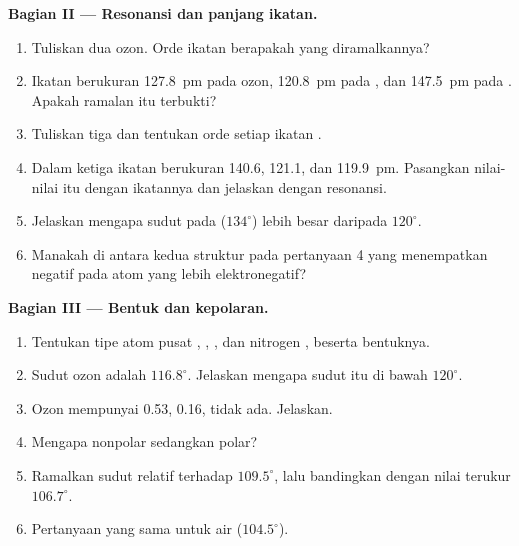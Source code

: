 \begin{problem}
\medskip
\noindent\textbf{Bagian II --- Resonansi dan panjang ikatan.}
\begin{enumerate}[resume]
  \item Tuliskan dua  ozon. Orde ikatan berapakah yang
        diramalkannya?
  \item Ikatan  berukuran \qty{127.8}{pm} pada ozon,
        \qty{120.8}{pm} pada , dan \qty{147.5}{pm} pada
        . Apakah ramalan itu terbukti?
  \item Tuliskan tiga   dan tentukan orde
        setiap ikatan .
  \item Dalam  ketiga ikatan  berukuran 140.6, 121.1,
        dan \qty{119.9}{pm}. Pasangkan nilai-nilai itu dengan ikatannya
        dan jelaskan dengan resonansi.
  \item Jelaskan mengapa sudut  pada  ($134^\circ$)
        lebih besar daripada $120^\circ$.
  \item Manakah di antara kedua struktur pada pertanyaan 4 yang
        menempatkan  negatif pada atom yang lebih
        elektronegatif?
\end{enumerate}

\medskip
\noindent\textbf{Bagian III --- Bentuk dan kepolaran.}
\begin{enumerate}[resume]
  \item Tentukan tipe  atom pusat , ,
        , dan nitrogen , beserta bentuknya.
  \item Sudut ozon adalah $116.8^\circ$. Jelaskan mengapa sudut itu di
        bawah $120^\circ$.
  \item Ozon mempunyai  \qty{0.53}{\debye}, 
        \qty{0.16}{\debye},  tidak ada. Jelaskan.
  \item Mengapa  nonpolar sedangkan  polar?
  \item Ramalkan sudut  relatif terhadap $109.5^\circ$, lalu
        bandingkan dengan nilai terukur $106.7^\circ$.
  \item Pertanyaan yang sama untuk air ($104.5^\circ$).
\end{enumerate}


\end{problem}
